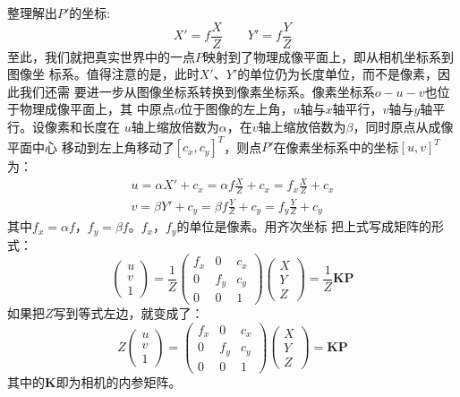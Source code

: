\documentclass[11pt]{article}
\begin{document}
整理解出$P'$的坐标:
\begin{equation}
    X' = f\frac{X}{Z}
    \qquad
    Y' = f\frac{Y}{Z}
\end{equation}
至此，我们就把真实世界中的一点$P$映射到了物理成像平面上，即从相机坐标系到图像坐
标系。值得注意的是，此时$X'$、$Y'$的单位仍为长度单位，而不是像素，因此我们还需
要进一步从图像坐标系转换到像素坐标系。像素坐标系$o-u-v$也位于物理成像平面上，其
中原点$o$位于图像的左上角，$u$轴与$x$轴平行，$v$轴与$y$轴平行。设像素和长度在
$u$轴上缩放倍数为$\alpha$，在$v$轴上缩放倍数为$\beta$，同时原点从成像平面中心
移动到左上角移动了$[c_x, c_y]^T$，则点$P'$在像素坐标系中的坐标$[u,v]^T$为：
\begin{equation}
    \begin{split}
    u = \alpha X' + c_x = \alpha f\frac{X}{Z}+c_x = f_x\frac{X}{Z}+c_x
    \\
    v = \beta Y' + c_y = \beta f\frac{Y}{Z}+c_y = f_y\frac{Y}{Z}+c_y
    \end{split}
\end{equation}
其中$f_x=\alpha f$，$f_y = \beta f$。$f_x$，$f_y$的单位是像素。用齐次坐标
把上式写成矩阵的形式：
\begin{equation}
    \begin{pmatrix}
        u \\ v \\ 1
    \end{pmatrix}
    =
    \frac{1}{Z}
    \begin{pmatrix}
        f_x & 0 & c_x  \\
        0 & f_y & c_y  \\
        0 & 0 & 1
    \end{pmatrix}
    \begin{pmatrix}
        X \\ Y \\ Z
    \end{pmatrix}
    =
    \frac{1}{Z}\mathbf{K}\mathbf{P}
\end{equation}
如果把$Z$写到等式左边，就变成了：
\begin{equation}
    Z
    \begin{pmatrix}
        u \\ v \\ 1
    \end{pmatrix}
    =
    \begin{pmatrix}
        f_x & 0 & c_x  \\
        0 & f_y & c_y  \\
        0 & 0 & 1
    \end{pmatrix}
    \begin{pmatrix}
        X \\ Y \\ Z
    \end{pmatrix}
    =
    \mathbf{K}\mathbf{P}
\end{equation}
其中的$\mathbf{K}$即为相机的内参矩阵。
\end{document}
